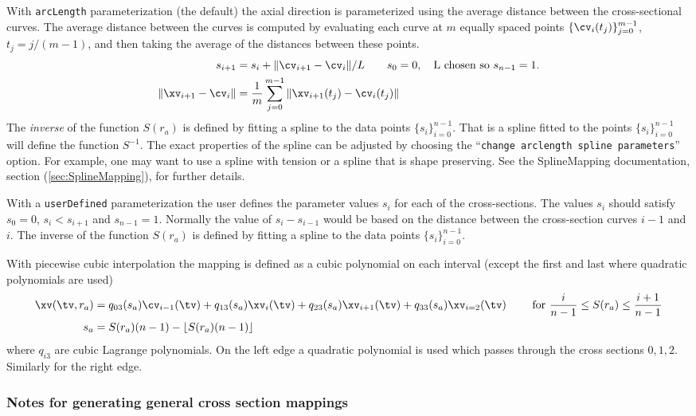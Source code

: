 With {\tt arcLength} parameterization (the default) the axial direction is parameterized
using the average distance between the cross-sectional curves. The average
distance between the curves is computed by evaluating each curve at $m$ equally spaced
points $\{\cv_i(t_j)\}_{j=0}^{m-1}$, $t_j=j/(m-1)$, and then taking the average of the distances
between these points.
\begin{align*}
    s_{i+1} &= s_i + \| \cv_{i+1} - \cv_i \| / L \qquad s_0=0, \quad \mbox{L chosen so $s_{n-1}=1.$}  \\
    \| \xv_{i+1} - \cv_i \| & = {1\over m} \sum_{j=0}^{m-1} \| \xv_{i+1}(t_j)-\cv_i(t_j) \| 
\end{align*} 
The {\em inverse} of the function $S(r_a)$ 
is defined by fitting a spline to the data points $\{ s_i \}_{i=0}^{n-1}$.
That is a spline fitted to the points $\{ s_i \}_{i=0}^{n-1}$ will define the 
function $S^{-1}$. The exact properties of the spline can be adjusted by choosing the
``{\tt change arclength spline parameters}'' option. For example, one may want to use a spline
with tension or a spline that is shape preserving. See the SplineMapping documentation, 
section (\ref{sec:SplineMapping}), for further details.

With a {\tt userDefined} parameterization the user defines the parameter values $s_i$
for each of the cross-sections. The values $s_i$ should satisfy $s_0=0$, $s_i<s_{i+1}$ and
$s_{n-1}=1.$ Normally the value of $s_i-s_{i-1}$ would be based on the distance between
the cross-section curves $i-1$ and $i$. The inverse of the function $S(r_a)$ 
is defined by fitting a spline to the data points $\{ s_i \}_{i=0}^{n-1}$.

With piecewise cubic interpolation the mapping is defined as a cubic polynomial on each interval (except the
first and last where quadratic polynomials are used)
\begin{align*}
  \xv(\tv,r_a) & = q_{03}(s_a)\cv_{i-1}(\tv) + q_{13}(s_a)\xv_{i}(\tv) + 
                 q_{23}(s_a)\xv_{i+1}(\tv) + q_{33}(s_a)\xv_{i=2}(\tv) 
       \qquad \mbox{~for~}  {i\over n-1} \le S(r_a) \le {i+1 \over n-1} \\
  s_a &= S(r_a)(n-1) - \lfloor S(r_a) (n-1) \rfloor
\end{align*}
where $q_{i3}$ are cubic Lagrange polynomials. On the left edge a quadratic polynomial is used
which passes through the cross sections $0,1,2$. Similarly for the right edge. 

\subsubsection{Notes for generating general cross section mappings}


